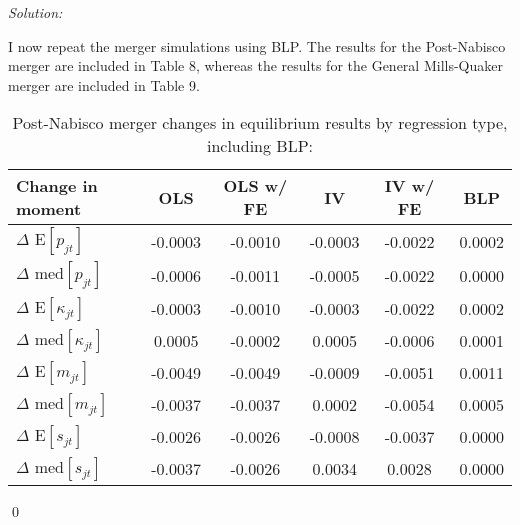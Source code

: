 \documentclass[12pt]{article}
\newenvironment{problem}[2][Problem]{\begin{trivlist}
\item[\hskip \labelsep {\bfseries #1}\hskip \labelsep {\bfseries #2.}]}{\end{trivlist}}
\newenvironment{sol}
    {\emph{Solution:}
    }
    {
    \qed
    }
\begin{document}
\begin{problem}{7}
\end{problem}
\begin{sol}
I now repeat the merger simulations using BLP. The results for the Post-Nabisco merger are included in Table 8, whereas the results for the General Mills-Quaker merger are included in Table 9. 
\begin{center}
    \begin{table}[htbp]
        \centering
        \caption{Post-Nabisco merger changes in equilibrium results by regression type, including BLP:}
          \begin{tabular}{lccccc}
              \toprule
                Change in moment    & OLS          & OLS w/ FE & IV & IV w/ FE&BLP         \\
              \midrule
                $\Delta$ E$[p_{jt}]$       &-0.0003&-0.0010&-0.0003&-0.0022&0.0002\\
                $\Delta$ med$[p_{jt}]$      &-0.0006&-0.0011&-0.0005&-0.0022&0.0000  \\
                \midrule
                $\Delta$ E$[\kappa_{jt}]$   &-0.0003&-0.0010&-0.0003&-0.0022&0.0002\\
                $\Delta$ med$[\kappa_{jt}]$ &0.0005 &-0.0002&0.0005 & -0.0006&0.0001 \\
                \midrule
                $\Delta$ E$[m_{jt}]$        &-0.0049&-0.0049&-0.0009&-0.0051&0.0011\\
                $\Delta$ med$[m_{jt}]$      &-0.0037&-0.0037&0.0002 &-0.0054&0.0005  \\
                 \midrule
                $\Delta$  E$[s_{jt}]$      &-0.0026&-0.0026&-0.0008&-0.0037&0.0000 \\
                $\Delta$ med$[s_{jt}]$     &-0.0037&-0.0026&0.0034 &0.0028&0.0000   \\
              \bottomrule
          \end{tabular}
        \label{tab:pn_merger}
      \end{table}
\end{center}


\end{sol}
\end{document}

